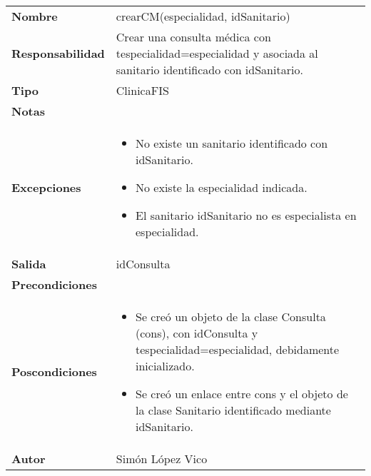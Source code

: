 \documentclass[11pt,a4paper]{article}
\newenvironment{itemizenomargins}
    {\begin{minipage}[t]{1\linewidth}\begin{itemize}}
    {\end{itemize}\end{minipage}}
\begin{document}
\begin{table}[H]
	\centering
	\label{my-label}
	\begin{tabularx}{\textwidth}{l|X}
		\textbf{Nombre}          & crearCM(especialidad, idSanitario) \\
		\textbf{Responsabilidad} & Crear una consulta médica con tespecialidad=especialidad y asociada al sanitario identificado con idSanitario. \\
		\textbf{Tipo}            & ClinicaFIS \\
		\textbf{Notas}           & \\
		\textbf{Excepciones}     &
		\begin{itemizenomargins}
			\item No existe un sanitario identificado con idSanitario.
			\item No existe la especialidad indicada.
			\item El sanitario idSanitario no es especialista en especialidad.
		\end{itemizenomargins} \\
		\textbf{Salida}          & idConsulta \\
		\textbf{Precondiciones}  & \\
		\textbf{Poscondiciones}  & 
\begin{itemizenomargins}
			\item Se creó un objeto de la clase Consulta (cons), con idConsulta y tespecialidad=especialidad, debidamente inicializado.
			\item Se creó un enlace entre cons y el objeto de la clase Sanitario identificado mediante idSanitario.			
		\end{itemizenomargins} \\
		\textbf{Autor}			 & Simón López Vico
	\end{tabularx}
\end{table}
\end{document}
